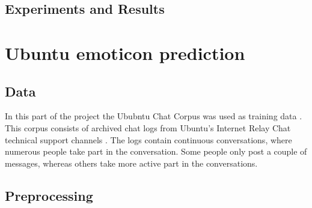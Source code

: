 \documentclass{article} %
\newcommand{\red}[1]{\textit{\color{red}{#1}}}
\begin{document}
\subsection{Experiments and Results}

\begin{comment}
Experiments / Empirical evaluation (roughly 2-3 pages)
• Any details about experiments (dataset sizes, parameter selection, etc)
• Results
• Analysis (discussion of results / visualization / findings / etc)
\end{comment}





\section{Ubuntu emoticon prediction}

\begin{comment}
Approach (roughly 2-3 pages)
• Explain the model; if any important assumptions are made at this stage, explain why they are
reasonable or necessary
• Explain learning / inference algorithms
• Explaining (perhaps briefly) any necessary preprocessing / postprocesing / data acquisition stages
(maybe earlier, depending on the project; may also move to the experimental section)
\end{comment}



\subsection{Data}

In this part of the project the Ububntu Chat Corpus was used as training data \red{SOME REFERENCE HERE}. This corpus consists of archived chat logs  from Ubuntu's Internet Relay Chat technical support channels \red {Reference}. The logs contain continuous conversations, where numerous people take part in the conversation. Some people only post a couple of messages, whereas others take more active part in the conversations. 

\subsection{Preprocessing}
\end{document}
